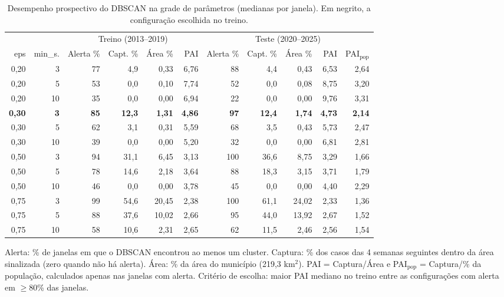 \begin{table}[htbp]
\centering
\small
\caption{Desempenho prospectivo do DBSCAN na grade de parâmetros (medianas por janela). Em negrito, a configuração escolhida no treino.}
\label{tab:grade}
\begin{adjustbox}{max width=\linewidth}
\begin{tabular}{rrrrrrrrrrr}
\toprule
& & \multicolumn{4}{c}{Treino (2013--2019)} & \multicolumn{5}{c}{Teste (2020--2025)} \\
\cmidrule(lr){3-6}\cmidrule(lr){7-11}
eps & min\_s. & Alerta \% & Capt. \% & Área \% & PAI & Alerta \% & Capt. \% & Área \% & PAI & PAI$_\text{pop}$ \\
\midrule
0,20 & 3 & 77 & 4,9 & 0,33 & 6,76 & 88 & 4,4 & 0,43 & 6,53 & 2,64 \\
0,20 & 5 & 53 & 0,0 & 0,10 & 7,74 & 52 & 0,0 & 0,08 & 8,75 & 3,20 \\
0,20 & 10 & 35 & 0,0 & 0,00 & 6,94 & 22 & 0,0 & 0,00 & 9,76 & 3,31 \\
\textbf{0,30} & \textbf{3} & \textbf{85} & \textbf{12,3} & \textbf{1,31} & \textbf{4,86} & \textbf{97} & \textbf{12,4} & \textbf{1,74} & \textbf{4,73} & \textbf{2,14} \\
0,30 & 5 & 62 & 3,1 & 0,31 & 5,59 & 68 & 3,5 & 0,43 & 5,73 & 2,47 \\
0,30 & 10 & 39 & 0,0 & 0,00 & 5,20 & 32 & 0,0 & 0,00 & 6,81 & 2,81 \\
0,50 & 3 & 94 & 31,1 & 6,45 & 3,13 & 100 & 36,6 & 8,75 & 3,29 & 1,66 \\
0,50 & 5 & 78 & 14,6 & 2,18 & 3,64 & 88 & 18,3 & 3,15 & 3,71 & 1,79 \\
0,50 & 10 & 46 & 0,0 & 0,00 & 3,78 & 45 & 0,0 & 0,00 & 4,40 & 2,29 \\
0,75 & 3 & 99 & 54,6 & 20,45 & 2,38 & 100 & 61,1 & 24,02 & 2,33 & 1,36 \\
0,75 & 5 & 88 & 37,6 & 10,02 & 2,66 & 95 & 44,0 & 13,92 & 2,67 & 1,52 \\
0,75 & 10 & 58 & 10,6 & 2,31 & 2,65 & 62 & 11,5 & 2,46 & 2,56 & 1,54 \\
\bottomrule
\end{tabular}
\end{adjustbox}
\par\smallskip\begin{minipage}{0.95\linewidth}\footnotesize Alerta: \% de janelas em que o DBSCAN encontrou ao menos um cluster. Captura: \% dos casos das 4 semanas seguintes dentro da área sinalizada (zero quando não há alerta). Área: \% da área do município (219,3 km$^2$). PAI = Captura/Área e PAI$_\text{pop}$ = Captura/\% da população, calculados apenas nas janelas com alerta. Critério de escolha: maior PAI mediano no treino entre as configurações com alerta em $\geq$80\% das janelas.\end{minipage}
\end{table}
